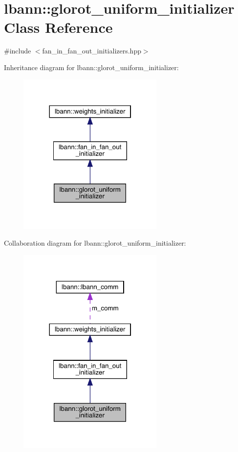 \hypertarget{classlbann_1_1glorot__uniform__initializer}{}\section{lbann\+:\+:glorot\+\_\+uniform\+\_\+initializer Class Reference}
\label{classlbann_1_1glorot__uniform__initializer}


{\ttfamily \#include $<$fan\+\_\+in\+\_\+fan\+\_\+out\+\_\+initializers.\+hpp$>$}



Inheritance diagram for lbann\+:\+:glorot\+\_\+uniform\+\_\+initializer\+:\nopagebreak
\begin{figure}[H]
\begin{center}
\leavevmode
\includegraphics[width=204pt]{classlbann_1_1glorot__uniform__initializer__inherit__graph}
\end{center}
\end{figure}


Collaboration diagram for lbann\+:\+:glorot\+\_\+uniform\+\_\+initializer\+:\nopagebreak
\begin{figure}[H]
\begin{center}
\leavevmode
\includegraphics[width=204pt]{classlbann_1_1glorot__uniform__initializer__coll__graph}
\end{center}
\end{figure}
